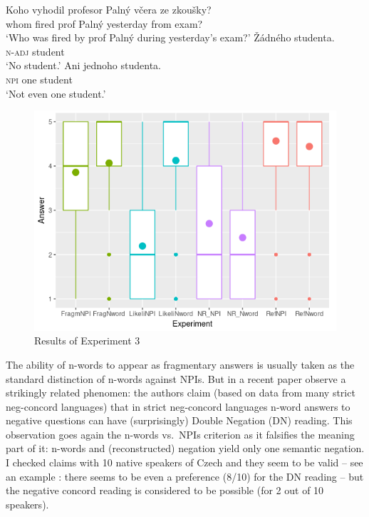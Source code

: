 \documentclass[output=paper,
]{langscibook}
\begin{document}
\ea \label{ex-35} \gll Koho vyhodil profesor Palný včera ze zkoušky?\\
whom fired prof Palný yesterday from exam?\\
\glt `Who was fired by prof Palný during yesterday's exam?'
\ea \gll Žádného studenta.\\
\textsc{n-adj} student\\
\glt `No student.'
\ex \gll Ani jednoho studenta.\\
\textsc{npi} one student\\
\glt `Not even one student.'
\z
\z

\begin{figure}
\centering
\includegraphics[scale=0.8]{figures/Rplot04.png}
\caption{Results of Experiment 3}\label{fig:exp3}
\end{figure}

\noindent The ability of n-words to appear as fragmentary answers is usually taken as the standard distinction of n-words against NPIs. But in a recent paper  \cite{fualuaus2016fragment} observe a strikingly related phenomen: the authors claim (based on data from many strict neg-concord languages) that in strict neg-concord languages n-word answers to negative questions can have (surprisingly) Double Negation (DN) reading. This observation goes again the n-words vs.~NPIs criterion as it falsifies the meaning part of it: n-words and (reconstructed) negation yield only one semantic negation. I checked  claims with 10 native speakers of Czech and they seem to be valid -- see an example : there seems to be even a preference (8/10) for the DN reading --  but the negative concord reading  is considered to be possible (for 2 out of 10 speakers).
\end{document}

